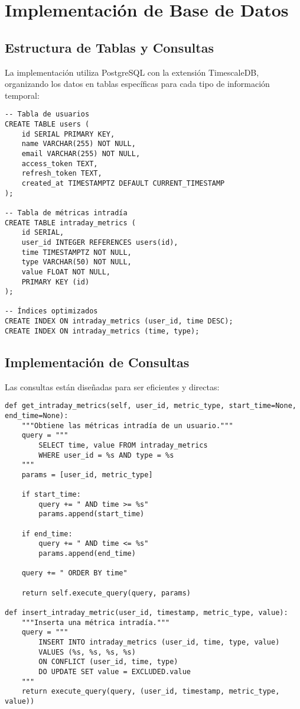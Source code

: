 \section{Implementación de Base de Datos}
\label{annex:code:db_implementation}

\subsection{Estructura de Tablas y Consultas}
La implementación utiliza PostgreSQL con la extensión TimescaleDB, organizando los datos en tablas específicas para cada tipo de información temporal:

\begin{lstlisting}[caption={Estructura de tablas principales}, label={lst:table_structure}]
-- Tabla de usuarios
CREATE TABLE users (
    id SERIAL PRIMARY KEY,
    name VARCHAR(255) NOT NULL,
    email VARCHAR(255) NOT NULL,
    access_token TEXT,
    refresh_token TEXT,
    created_at TIMESTAMPTZ DEFAULT CURRENT_TIMESTAMP
);

-- Tabla de métricas intradía
CREATE TABLE intraday_metrics (
    id SERIAL,
    user_id INTEGER REFERENCES users(id),
    time TIMESTAMPTZ NOT NULL,
    type VARCHAR(50) NOT NULL,
    value FLOAT NOT NULL,
    PRIMARY KEY (id)
);

-- Índices optimizados
CREATE INDEX ON intraday_metrics (user_id, time DESC);
CREATE INDEX ON intraday_metrics (time, type);
\end{lstlisting}

\subsection{Implementación de Consultas}
Las consultas están diseñadas para ser eficientes y directas:

\begin{lstlisting}[caption={Ejemplo de consultas implementadas en db.py}, label={lst:query_implementation}]
def get_intraday_metrics(self, user_id, metric_type, start_time=None, end_time=None):
    """Obtiene las métricas intradía de un usuario."""
    query = """
        SELECT time, value FROM intraday_metrics
        WHERE user_id = %s AND type = %s
    """
    params = [user_id, metric_type]
    
    if start_time:
        query += " AND time >= %s"
        params.append(start_time)
    
    if end_time:
        query += " AND time <= %s"
        params.append(end_time)
    
    query += " ORDER BY time"
    
    return self.execute_query(query, params)

def insert_intraday_metric(user_id, timestamp, metric_type, value):
    """Inserta una métrica intradía."""
    query = """
        INSERT INTO intraday_metrics (user_id, time, type, value)
        VALUES (%s, %s, %s, %s)
        ON CONFLICT (user_id, time, type) 
        DO UPDATE SET value = EXCLUDED.value
    """
    return execute_query(query, (user_id, timestamp, metric_type, value))
\end{lstlisting}

